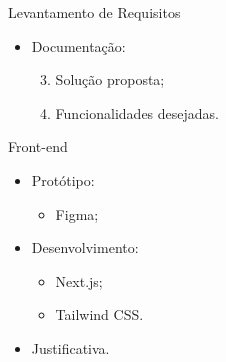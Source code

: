 \begin{frame}{Levantamento de Requisitos}
    \begin{itemize}
        \item Documentação: \vspace{0.5cm}
              \begin{enumerate}
                  \setcounter{enumi}{2}
                  \item Solução proposta; \vspace{0.5cm}
                  \item Funcionalidades desejadas. \vspace{0.5cm}
              \end{enumerate}
    \end{itemize}
\end{frame}

\begin{frame}{Front-end}
    \begin{itemize}
        \item Protótipo: \vspace{0.5cm}
              \begin{itemize}
                  \item Figma; \vspace{0.5cm}
              \end{itemize}
        \item Desenvolvimento: \vspace{0.5cm}
              \begin{itemize}
                  \item Next.js; \vspace{0.5cm}
                  \item Tailwind CSS. \vspace{0.5cm}
              \end{itemize}
        \item Justificativa. \vspace{0.5cm}
    \end{itemize}
\end{frame}

